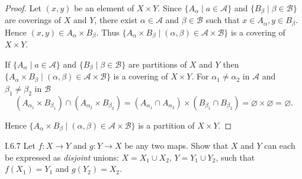 \begin{proof}
	Let \( (x, y) \) be an element of \( X\times Y \). Since \( \{ A_{\alpha} \mid a \in \mathscr{A} \} \) and \(\{B_{\beta} \mid \beta \in \mathscr{B}\}\) are coverings of \( X \) and \( Y \), there exist \( \alpha \in \mathscr{A} \) and \( \beta \in \mathscr{B} \) such that \( x \in A_{\alpha}, y \in B_{\beta} \). Hence \( (x, y) \in A_{\alpha} \times B_{\beta} \). Thus \(\{A_{\alpha} \times B_{\beta} \mid (\alpha, \beta) \in \mathscr{A} \times \mathscr{B}\}\) is a covering of \(X \times Y\).

	If \( \{ A_{\alpha} \mid a \in \mathscr{A} \} \) and \(\{B_{\beta} \mid \beta \in \mathscr{B}\}\) are partitions of \( X \) and \( Y \) then \(\{A_{\alpha} \times B_{\beta} \mid (\alpha, \beta) \in \mathscr{A} \times \mathscr{B}\}\) is a covering of \(X \times Y\). For \( \alpha_{1} \ne \alpha_{2} \) in \( \mathscr{A} \) and \( \beta_{1} \ne \beta_{2} \) in \( \mathscr{B} \)
	\[
		(A_{\alpha_{1}} \times B_{\beta_{1}}) \cap (A_{\alpha_{2}} \times B_{\beta_{2}}) = (A_{\alpha_{1}} \cap A_{\alpha_{2}}) \times (B_{\beta_{1}} \cap B_{\beta_{2}}) = \varnothing \times \varnothing = \varnothing.
	\]

	Hence \(\{A_{\alpha} \times B_{\beta} \mid (\alpha, \beta) \in \mathscr{A} \times \mathscr{B}\}\) is a partition of \(X \times Y\).
\end{proof}

\begin{problem}{I.6.7}\label{problem:I.6.7}
Let \(f : X \to Y\) and \(g : Y \to X\) be any two maps. Show that \(X\) and \(Y\) can each be expressed as \textit{disjoint} unions: \(X = X_{1} \cup X_{2}\), \(Y = Y_{1} \cup Y_{2}\), such that \(f(X_{1}) = Y_{1}\) and \(g(Y_{2}) = X_{2}\).
\end{problem}

